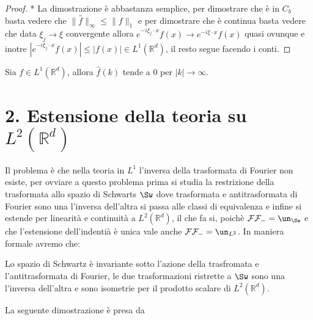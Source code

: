 \begin{proof} *
    La dimostrazione è abbastanza semplice, per dimostrare che è in $C_b$ basta vedere che $\| \hat{f}\|_\infty \leq \| f\|_1$ e per dimostrare che è continua basta vedere che data $\xi_j \to \xi$ convergente allora $e^{-i \xi_j \cdot x} f(x) \to e^{-i \xi \cdot x} f(x)$ quasi ovunque e inotre $|e^{-i \xi_j \cdot x} f(x)| \leq |f(x)| \in L^1(\mathbb{R}^d)$, il resto segue facendo i conti.
\end{proof}


\begin{proposition}
    Sia $f \in L^1(\mathbb{R}^d)$, allora $\hat{f}(k)$ tende a $0$ per $|k| \to \infty$.
\end{proposition}



\section*{2. Estensione della teoria su $L^2(\mathbb{R}^d)$}
Il problema è che nella teoria in $L^1$ l'inversa della trasformata di Fourier non esiste, per ovviare a questo problema prima si studia la restrizione della trasformata allo spazio di Schwarts $\Sw$ dove trasformata e antitrasformata di Fourier sono una l'inversa dell'altra si passa alle classi di equivalenza e infine si estende per linearità e continuità a $L^2(\mathbb{R}^d)$, il che fa si, poichè $\mathcal{F}\mathcal{F}_- = \un_{\Sw}$ e che l'estensione dell'indentià è unica vale anche $\mathcal{F}\mathcal{F}_- = \un_{L^2}$. In maniera formale avremo che:
\begin{theorem}
    Lo spazio di Schwartz è invariante sotto l'azione della trasfromata e l'antitrasformata di Fourier, le due trasformazioni ristrette a $\Sw$ sono una l'inversa dell'altra e sono isometrie per il prodotto scalare di $L^2(\mathbb{R}^d)$. \label{thm:Fourier}
\end{theorem}

La seguente dimostrazione è presa da \cite{Mor}

